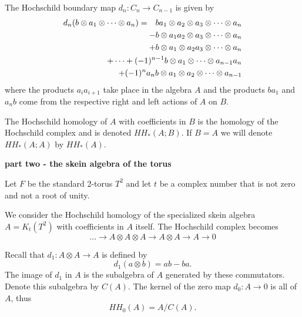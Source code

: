 \documentclass{slides}
\newcommand{\ot}{\otimes}
\begin{document}
\begin{slide}
The Hochschild boundary map $d_n : C_n \to C_{n-1}$ is given by
\begin{eqnarray}
d_n ( b \ot a_1 \ot \dots \ot a_n )
& = & b a_1 \ot a_2 \ot a_3 \ot \dots \ot a_n \nonumber \\
& & \hspace{-4cm} - b \ot a_1 a_2 \ot a_3 \ot \dots \ot a_n \nonumber \\
& & \hspace{-4cm} + b \ot a_1 \ot a_2 a_3 \ot \dots \ot a_n \nonumber \\
& & \hspace{-4cm} + \dots + (-1)^{n-1} b \ot a_1 \ot \dots \ot a_{n-1} a_n \nonumber \\
& & \hspace{-4cm} + (-1)^{n} a_n b \ot a_1 \ot a_2 \ot \dots \ot a_{n-1} \nonumber
\end{eqnarray}
where the products $a_i a_{i+1}$ take place in the algebra $A$
and the products $b a_1$ and $a_n b$ come from the respective
right and left actions of $A$ on $B$.

The Hochschild homology of $A$ with coefficients in $B$ is the homology
of the Hochschild complex and is denoted $HH_{*}(A; B)$.
If $B = A$ we will denote $HH_{*}(A; A)$ by $HH_{*}(A)$.
\end{slide}

\begin{slide}
\textbf{part two - the skein algebra of the torus}

Let $F$ be the
standard 2-torus $T^2$ and let
$t$ be a complex number that is not zero and not a root of unity.

We consider the Hochschild homology
of the specialized skein algebra $A = K_t(T^2)$ with
coefficients in $A$ itself.
The Hochschild complex becomes
\[
\dots \to A \ot A \ot A \to A \ot A \to A \to 0
\]

Recall that $d_1: A \ot A \to A$ is defined by
$$d_1(a \ot b) = ab - ba.$$  The image of $d_1$
in $A$ is the subalgebra of $A$ generated by these
commutators.  Denote this subalgebra by $C(A)$.
The kernel of the zero map $d_0 : A \to 0$ is
all of $A$, thus $$HH_0(A) = A/C(A).$$
\end{slide}
\end{document}
